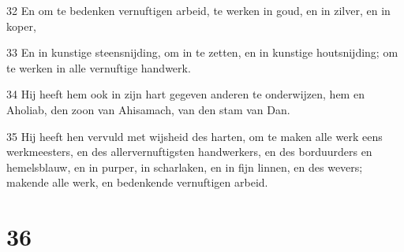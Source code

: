 \par 32 En om te bedenken vernuftigen arbeid, te werken in goud, en in zilver, en in koper,
\par 33 En in kunstige steensnijding, om in te zetten, en in kunstige houtsnijding; om te werken in alle vernuftige handwerk.
\par 34 Hij heeft hem ook in zijn hart gegeven anderen te onderwijzen, hem en Aholiab, den zoon van Ahisamach, van den stam van Dan.
\par 35 Hij heeft hen vervuld met wijsheid des harten, om te maken alle werk eens werkmeesters, en des allervernuftigsten handwerkers, en des borduurders en hemelsblauw, en in purper, in scharlaken, en in fijn linnen, en des wevers; makende alle werk, en bedenkende vernuftigen arbeid.

\chapter{36}

